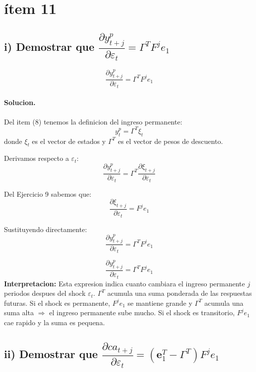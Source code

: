 \section*{ítem 11}

\subsection*{i) Demostrar que $\dfrac{\partial y_{t+j}^p}{\partial \varepsilon_t} = \Gamma^T F^j e_1$}

\begin{enunciado}
\[
    \frac{\partial y_{t+j}^p}{\partial \varepsilon_t} = \Gamma^T F^j e_1
\]
\end{enunciado}

\paragraph{Solucion.}

Del item (8) tenemos la definicion del ingreso permanente:
\[
    y_t^p = \Gamma^T \xi_t
\]
donde $\xi_t$ es el vector de estados y $\Gamma^T$ es el vector de pesos de descuento.

Derivamos respecto a $\varepsilon_t$:
\[
    \frac{\partial y_{t+j}^p}{\partial \varepsilon_t}
    = \Gamma^T \frac{\partial \xi_{t+j}}{\partial \varepsilon_t}
\]

Del Ejercicio 9 sabemos que:
\[
    \frac{\partial \xi_{t+j}}{\partial \varepsilon_t} = F^j e_1
\]

Sustituyendo directamente:
\[
    \frac{\partial y_{t+j}^p}{\partial \varepsilon_t} = \Gamma^T F^j e_1
\]

\begin{resultado}
\[
    \frac{\partial y_{t+j}^p}{\partial \varepsilon_t} = \Gamma^T F^j e_1
\]
\textbf{Interpretacion:} Esta expresion indica cuanto cambiara el ingreso permanente $j$ periodos despues del shock $\varepsilon_t$. $\Gamma^T$ acumula una suma ponderada de las respuestas futuras. Si el shock es permanente, $F^j e_1$ se mantiene grande y $\Gamma^T$ acumula una suma alta $\Rightarrow$ el ingreso permanente sube mucho. Si el shock es transitorio, $F^j e_1$ cae rapido y la suma es pequena.
\end{resultado}

\subsection*{ii) Demostrar que $\dfrac{\partial ca_{t+j}}{\partial \varepsilon_t} = (\mathbf{e}_1^T - \Gamma^T) F^j e_1$}


